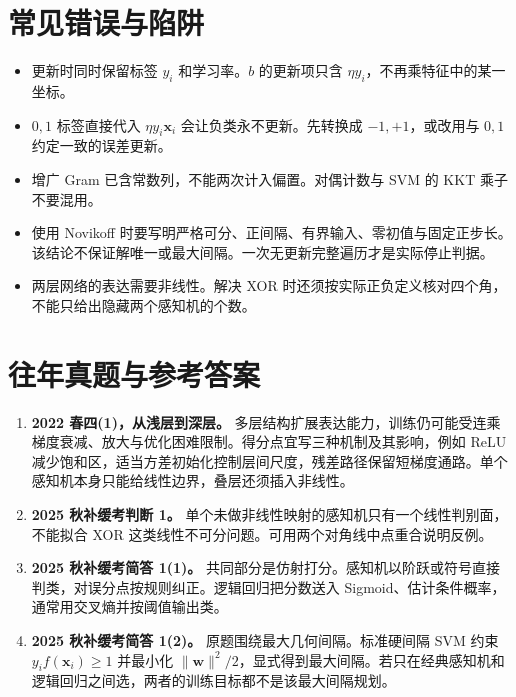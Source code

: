 \documentclass[UTF8,a4paper,zihao=-4,fontset=fandol]{ctexrep}
\begin{document}
\section{常见错误与陷阱}
\begin{itemize}[leftmargin=2em]
\item 更新时同时保留标签 \(y_i\) 和学习率。\(b\) 的更新项只含 \(\eta y_i\)，不再乘特征中的某一坐标。
\item \(0,1\) 标签直接代入 \(\eta y_i\bm x_i\) 会让负类永不更新。先转换成 \(-1,+1\)，或改用与 \(0,1\) 约定一致的误差更新。
\item 增广 Gram 已含常数列，不能两次计入偏置。对偶计数与 SVM 的 KKT 乘子不要混用。
\item 使用 Novikoff 时要写明严格可分、正间隔、有界输入、零初值与固定正步长。该结论不保证解唯一或最大间隔。一次无更新完整遍历才是实际停止判据。
\item 两层网络的表达需要非线性。解决 XOR 时还须按实际正负定义核对四个角，不能只给出隐藏两个感知机的个数。
\end{itemize}

\section{往年真题与参考答案}
\begin{enumerate}[leftmargin=2em]
\item \textbf{2022 春四(1)，从浅层到深层。} 多层结构扩展表达能力，训练仍可能受连乘梯度衰减、放大与优化困难限制。得分点宜写三种机制及其影响，例如 ReLU 减少饱和区，适当方差初始化控制层间尺度，残差路径保留短梯度通路。单个感知机本身只能给线性边界，叠层还须插入非线性。
\item \textbf{2025 秋补缓考判断 1。} 单个未做非线性映射的感知机只有一个线性判别面，不能拟合 XOR 这类线性不可分问题。可用两个对角线中点重合说明反例。
\item \textbf{2025 秋补缓考简答 1(1)。} 共同部分是仿射打分。感知机以阶跃或符号直接判类，对误分点按规则纠正。逻辑回归把分数送入 Sigmoid、估计条件概率，通常用交叉熵并按阈值输出类。
\item \textbf{2025 秋补缓考简答 1(2)。} 原题围绕最大几何间隔。标准硬间隔 SVM 约束 \(y_if(\bm x_i)\ge1\) 并最小化 \(\|\bm w\|^2/2\)，显式得到最大间隔。若只在经典感知机和逻辑回归之间选，两者的训练目标都不是该最大间隔规划。
\end{enumerate}
\end{document}
